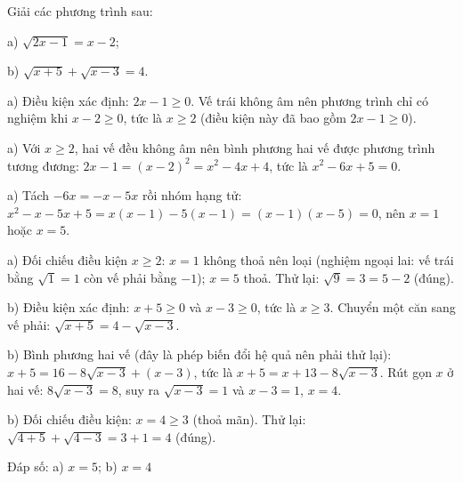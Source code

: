 \begin{problem}[9DS-CAN-048]
Giải các phương trình sau:

a) $\sqrt{2x - 1} = x - 2$;

b) $\sqrt{x + 5} + \sqrt{x - 3} = 4$.

\begin{solution}
a) Điều kiện xác định: $2x - 1 \geq 0$. Vế trái không âm nên phương trình chỉ có nghiệm khi $x - 2 \geq 0$, tức là $x \geq 2$ (điều kiện này đã bao gồm $2x - 1 \geq 0$).

a) Với $x \geq 2$, hai vế đều không âm nên bình phương hai vế được phương trình tương đương: $2x - 1 = (x - 2)^2 = x^2 - 4x + 4$, tức là $x^2 - 6x + 5 = 0$.

a) Tách $-6x = -x - 5x$ rồi nhóm hạng tử: $x^2 - x - 5x + 5 = x(x - 1) - 5(x - 1) = (x - 1)(x - 5) = 0$, nên $x = 1$ hoặc $x = 5$.

a) Đối chiếu điều kiện $x \geq 2$: $x = 1$ không thoả nên loại (nghiệm ngoại lai: vế trái bằng $\sqrt{1} = 1$ còn vế phải bằng $-1$); $x = 5$ thoả. Thử lại: $\sqrt{9} = 3 = 5 - 2$ (đúng).

b) Điều kiện xác định: $x + 5 \geq 0$ và $x - 3 \geq 0$, tức là $x \geq 3$. Chuyển một căn sang vế phải: $\sqrt{x + 5} = 4 - \sqrt{x - 3}$.

b) Bình phương hai vế (đây là phép biến đổi hệ quả nên phải thử lại): $x + 5 = 16 - 8\sqrt{x - 3} + (x - 3)$, tức là $x + 5 = x + 13 - 8\sqrt{x - 3}$. Rút gọn $x$ ở hai vế: $8\sqrt{x - 3} = 8$, suy ra $\sqrt{x - 3} = 1$ và $x - 3 = 1$, $x = 4$.

b) Đối chiếu điều kiện: $x = 4 \geq 3$ (thoả mãn). Thử lại: $\sqrt{4 + 5} + \sqrt{4 - 3} = 3 + 1 = 4$ (đúng).

Đáp số: a) $\boxed{x = 5}$; b) $\boxed{x = 4}$
\end{solution}
\end{problem}

